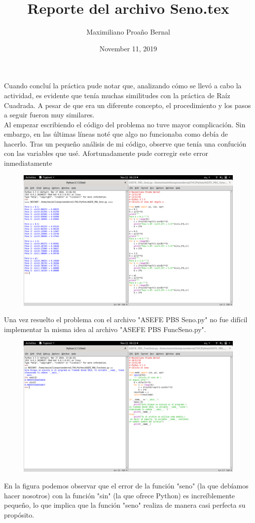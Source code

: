 \documentclass[]{article}
\title{Reporte del archivo Seno.tex}
\author{Maximiliano Proaño Bernal}
\date{November 11, 2019}
\begin{document}
\maketitle
Cuando concluí la práctica pude notar que, analizando cómo se llevó a cabo la actividad, es evidente que tenía muchas similitudes con la práctica de Raíz Cuadrada. A pesar de que era un diferente concepto, el procedimiento y los pasos a seguir fueron muy similares.\\

Al empezar escribiendo el código del problema no tuve mayor complicación. Sin embargo, en las últimas líneas noté que algo no funcionaba como debía de hacerlo. Tras un pequeño análisis de mi código, observe que tenía una confución con las variables que usé. Afortunadamente pude corregir este error inmediatamente
\begin{figure}[H]
	\centering
	\includegraphics[width=1.0\linewidth]{"Imagenes/Captura 6 Seno"}
	\caption{}
	\label{fig:captura-6-seno}
\end{figure}
Una vez resuelto el problema con el archivo "ASEFE PBS Seno.py" no fue difícil implementar la misma idea al archivo "ASEFE PBS FuncSeno.py".
\begin{figure}[H]
	\centering
	\includegraphics[width=1.0\linewidth]{"Imagenes/Captura 7 Seno"}
	\caption{}
	\label{fig:captura-7-seno}
\end{figure}
En la figura podemos observar que el error de la función "seno" (la que debíamos hacer nosotros) con la función "sin" (la que ofrece Python) es increíblemente pequeño, lo que implica que la función "seno" realiza de manera casi perfecta su propósito.\\
\end{document}
